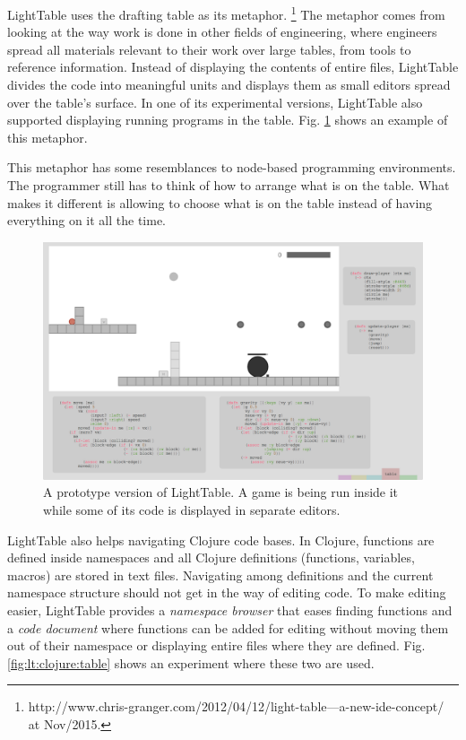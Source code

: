 \documentclass{./llncs2e/llncs}
\begin{document}

	LightTable uses the drafting table as its metaphor.
	\footnote{http://www.chris-granger.com/2012/04/12/light-table---a-new-ide-concept/ at Nov/2015.}
	The metaphor comes from looking at the way work is done in other fields of engineering, where engineers spread all materials relevant to their work over large tables, from tools to reference information. 
	Instead of displaying the contents of entire files, LightTable divides the code into meaningful units and displays them as small editors spread over the table's surface. 
	In one of its experimental versions, LightTable also supported displaying running programs in the table. 
	Fig. \ref{fig:lt:draft:table} shows an example of this metaphor.

	This metaphor has some resemblances to node-based programming environments. 
	The programmer still has to think of how to arrange what is on the table.
	What makes it different is allowing to choose what is on the table instead of having everything on it all the time.

	\begin{figure}
	  \centering
	  \includegraphics[width=1.0\textwidth]{img/lt_game_example__inv}
	    \caption{A prototype version of LightTable. A game is being run inside it while some of its code is displayed in separate editors.}
	  \label{fig:lt:draft:table}
	\end{figure} 

	LightTable also helps navigating Clojure code bases.
	In Clojure, functions are defined inside namespaces and all Clojure definitions (functions, variables, macros) are stored in text files. 
	Navigating among definitions and the current namespace structure should not get in the way of editing code. 
	To make editing easier, LightTable provides a \emph{namespace browser} that eases finding functions and a \emph{code document} where functions can be added for editing without moving them out of their namespace or displaying entire files where they are defined. 
	Fig. \ref{fig:lt:clojure:table} shows an experiment where these two are used.
\end{document}
